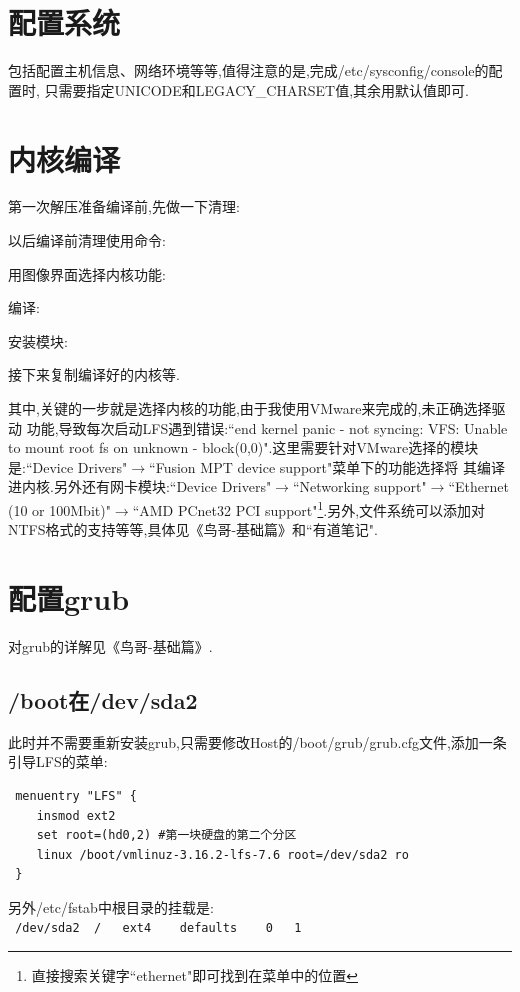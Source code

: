 \section{配置系统}
包括配置主机信息、网络环境等等,值得注意的是,完成/etc/sysconfig/console的配置时,
只需要指定UNICODE和LEGACY\_CHARSET值,其余用默认值即可.

\section{内核编译}
第一次解压准备编译前,先做一下清理:\\
\par
以后编译前清理使用命令:\\
\par
用图像界面选择内核功能:\\
\par
编译:\\
\par
安装模块:\\
\par
接下来复制编译好的内核等.
\par
其中,关键的一步就是选择内核的功能,由于我使用VMware来完成的,未正确选择驱动
功能,导致每次启动LFS遇到错误:``end kernel panic - not syncing: VFS: Unable to
 mount root fs on unknown - block(0,0)".这里需要针对VMware选择的模块是:``Device Drivers"$\rightarrow$``Fusion MPT device support"菜单下的功能选择将
 其编译进内核.另外还有网卡模块:``Device Drivers"$\rightarrow$``Networking support"$\rightarrow$``Ethernet (10 or 100Mbit)"$\rightarrow$``AMD PCnet32 PCI support"\footnote[1]{直接搜索关键字``ethernet"即可找到在菜单中的位置}.另外,文件系统可以添加对NTFS格式的支持等等,具体见《鸟哥-基础篇》和``有道笔记".
 
 \section{配置grub} 
 对grub的详解见《鸟哥-基础篇》.
 \subsection{/boot在/dev/sda2}
 此时并不需要重新安装grub,只需要修改Host的/boot/grub/grub.cfg文件,添加一条
 引导LFS的菜单:
 \begin{verbatim}
 menuentry "LFS" {
    insmod ext2
    set root=(hd0,2) #第一块硬盘的第二个分区
    linux /boot/vmlinuz-3.16.2-lfs-7.6 root=/dev/sda2 ro
 }
\end{verbatim}
\vspace{-2ex}
 \par
 另外/etc/fstab中根目录的挂载是:\\
\verb" /dev/sda2  /   ext4    defaults    0   1"

